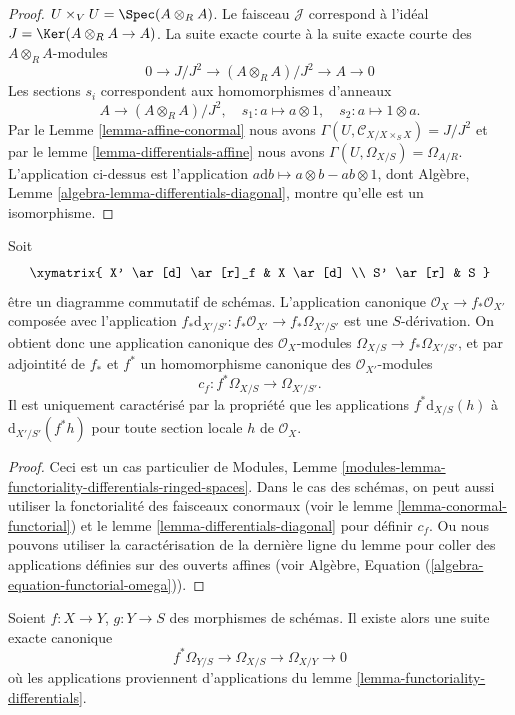 \begin{proof}
$U \times_V U = \Spec(A \otimes_R A)$. Le faisceau $\mathcal{J}$ correspond
à l'idéal $J = \Ker(A \otimes_R A \to A)$. La
suite exacte courte à la suite exacte courte
des $A \otimes_R A$-modules
$$
0 \to J/J^2 \to (A \otimes_R A)/J^2 \to A \to 0
$$
Les sections $s_i$ correspondent aux homomorphismes d'anneaux
$$
A \longrightarrow (A \otimes_R A)/J^2,\quad
s_1 : a \mapsto a \otimes 1,\quad
s_2 : a \mapsto 1 \otimes a.
$$
Par le Lemme \ref{lemma-affine-conormal} nous avons
$\Gamma(U, \mathcal{C}_{X/X \times_S X}) = J/J^2$ et par le lemme
\ref{lemma-differentials-affine} nous avons $\Gamma(U, \Omega_{X/S}) = \Omega_{A/R}$.
L'application ci-dessus
est l'application $a \text{d}b \mapsto a \otimes b - ab \otimes 1$, dont
Algèbre, Lemme \ref{algebra-lemma-differentials-diagonal}, montre qu'elle est
un isomorphisme.
\end{proof}

\begin{lemma}
\label{lemma-functoriality-differentials}
Soit
$$
\xymatrix{
X' \ar[d] \ar[r]_f & X \ar[d] \\
S' \ar[r] & S
}
$$
être un diagramme commutatif de schémas. L'application
canonique $\mathcal{O}_X \to f_*\mathcal{O}_{X'}$ composée avec l'application
$f_*\text{d}_{X'/S'} : f_*\mathcal{O}_{X'} \to f_*\Omega_{X'/S'}$ est une $S$-dérivation. On obtient
donc une application canonique des $\mathcal{O}_X$-modules $\Omega_{X/S} \to f_*\Omega_{X'/S'}$,
et par adjointité de $f_*$
et $f^*$ un homomorphisme
canonique des $\mathcal{O}_{X'}$-modules
$$
c_f : f^*\Omega_{X/S} \longrightarrow \Omega_{X'/S'}.
$$
Il est uniquement caractérisé par la propriété que
les applications $f^*\text{d}_{X/S}(h)$ à $\text{d}_{X'/S'}(f^* h)$ pour toute
section locale $h$ de $\mathcal{O}_X$.
\end{lemma}

\begin{proof}
Ceci est un cas particulier
de Modules, Lemme \ref{modules-lemma-functoriality-differentials-ringed-spaces}. Dans le cas des schémas, on peut
aussi utiliser la fonctorialité des faisceaux conormaux
(voir le lemme \ref{lemma-conormal-functorial}) et le lemme \ref{lemma-differentials-diagonal} pour définir
$c_f$. Ou nous pouvons utiliser la caractérisation
de la dernière ligne du lemme pour coller des
applications définies sur des
ouverts affines (voir Algèbre, Equation (\ref{algebra-equation-functorial-omega})).
\end{proof}

\begin{lemma}
\label{lemma-triangle-differentials}
Soient $f : X \to Y$, $g : Y \to S$ des morphismes de schémas. Il
existe alors une suite exacte canonique
$$
f^*\Omega_{Y/S} \to \Omega_{X/S} \to \Omega_{X/Y} \to 0
$$
où les applications proviennent
d'applications du lemme \ref{lemma-functoriality-differentials}.
\end{lemma}

